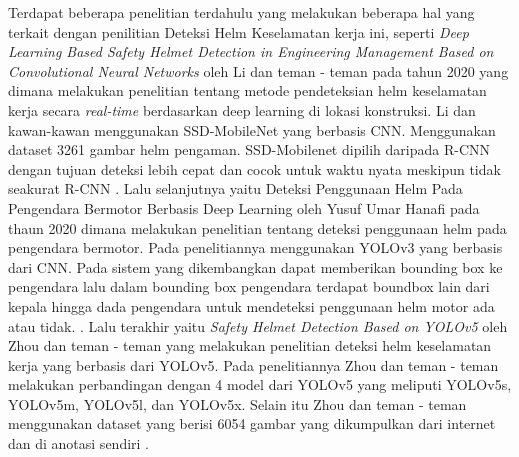 Terdapat beberapa penelitian terdahulu yang melakukan beberapa hal yang terkait dengan penilitian Deteksi Helm Keselamatan kerja ini, seperti \emph{Deep Learning Based Safety Helmet Detection in Engineering Management Based on Convolutional Neural Networks} oleh Li dan teman - teman pada tahun 2020 yang dimana melakukan penelitian tentang metode pendeteksian helm keselamatan kerja secara \emph{real-time} berdasarkan deep learning di lokasi konstruksi. Li dan kawan-kawan menggunakan SSD-MobileNet yang berbasis CNN. Menggunakan dataset 3261 gambar helm pengaman. SSD-Mobilenet dipilih daripada R-CNN dengan tujuan deteksi lebih cepat dan cocok untuk waktu nyata meskipun tidak seakurat R-CNN \cite{li2020deep}. Lalu selanjutnya yaitu Deteksi Penggunaan Helm Pada Pengendara Bermotor Berbasis Deep Learning oleh Yusuf Umar Hanafi pada thaun 2020 dimana melakukan penelitian tentang
deteksi penggunaan helm pada pengendara bermotor. 
Pada penelitiannya menggunakan YOLOv3 yang berbasis dari CNN. 
Pada sistem yang dikembangkan dapat memberikan bounding box ke 
pengendara lalu dalam bounding box pengendara terdapat boundbox 
lain dari kepala hingga dada pengendara untuk mendeteksi 
penggunaan helm motor ada atau tidak. \cite{hanafi2020deteksi}. Lalu terakhir yaitu \emph{Safety Helmet Detection Based on YOLOv5} oleh Zhou dan teman - teman yang melakukan penelitian deteksi helm keselamatan kerja yang 
berbasis dari YOLOv5. Pada penelitiannya Zhou dan teman - teman melakukan perbandingan dengan 4 model dari 
YOLOv5 yang meliputi YOLOv5s, YOLOv5m, YOLOv5l, dan YOLOv5x. Selain itu Zhou dan teman - teman menggunakan 
dataset yang berisi 6054 gambar yang dikumpulkan dari internet dan di anotasi sendiri \cite{zhou_zhao_nie_2021}.